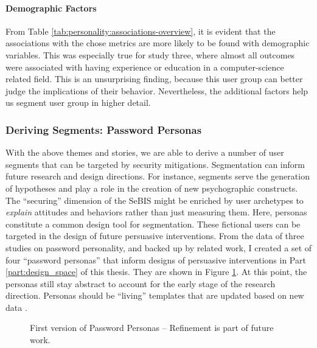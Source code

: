 \paragraph{Demographic Factors}
From Table \ref{tab:personality:associations-overview}, it is evident that the associations with the chose metrics are more likely to be found with demographic variables. This was especially true for study three, where almost all outcomes were associated with having experience or education in a computer-science related field. This is an unsurprising finding, because this user group can better judge the implications of their behavior. Nevertheless, the additional factors help us segment user group in higher detail. 

\subsubsection{Deriving Segments: Password Personas}\label{sec:personality:personas}
With the above themes and stories, we are able to derive a number of user segments that can be targeted by security mitigations. Segmentation can inform future research and design directions. For instance, segments serve the generation of hypotheses and play a role in the creation of new psychographic constructs. The ``securing'' dimension of the \gls{SeBIS} might be enriched by user archetypes to \textit{explain} attitudes and behaviors rather than just measuring them. Here, \glspl{persona} constitute a common design tool for segmentation. These fictional users can be targeted in the design of future persuasive interventions. From the data of three studies on password personality, and backed up by related work, I created a set of four ``password personas'' that inform designs of persuasive interventions in Part \ref{part:design_space} of this thesis. They are shown in Figure \ref{fig:personality:personas}. At this point, the personas still stay abstract to account for the early stage of the research direction. Personas should be ``living'' templates that are updated based on new data \cite{Gothelf2013LeanUX}. 

\begin{figure}
	\centering
	\caption{\label{fig:personality:personas} First version of Password Personas -- Refinement is part of future work.}
\end{figure}

